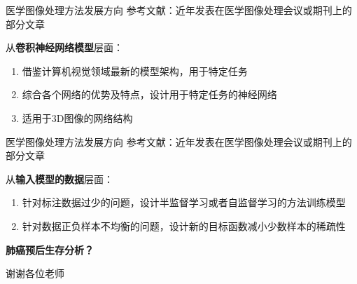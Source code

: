 \documentclass[10pt]{beamer}
\begin{document}
\begin{frame}{医学图像处理方法发展方向}
  参考文献：近年发表在医学图像处理会议或期刊上的部分文章
  \vspace{5 mm}

  从\textbf{卷积神经网络模型}层面：
  \begin{enumerate}[(1)]
    \item 借鉴计算机视觉领域最新的模型架构，用于特定任务
    \item 综合各个网络的优势及特点，设计用于特定任务的神经网络
    \item 适用于3D图像的网络结构
  \end{enumerate}

\end{frame}

\begin{frame}{医学图像处理方法发展方向}
  参考文献：近年发表在医学图像处理会议或期刊上的部分文章
  \vspace{5 mm}

  从\textbf{输入模型的数据}层面：
  \begin{enumerate}[(1)]
    \item 针对标注数据过少的问题，设计半监督学习或者自监督学习的方法训练模型
    \item 针对数据正负样本不均衡的问题，设计新的目标函数减小少数样本的稀疏性
  \end{enumerate}

  \textbf{肺癌预后生存分析？}
\end{frame}

\begin{frame}[standout]
  谢谢各位老师
\end{frame}
\end{document}
